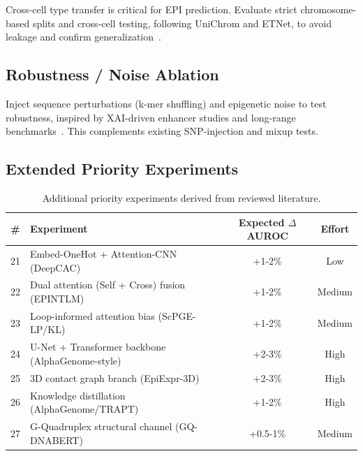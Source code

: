 \documentclass[11pt,a4paper]{article}
\begin{document}
Cross-cell type transfer is critical for EPI prediction. Evaluate strict chromosome-based splits and cross-cell testing, following UniChrom and ETNet, to avoid leakage and confirm generalization~\cite{unichrom,etnet}.

\subsection{Robustness / Noise Ablation}

Inject sequence perturbations (k-mer shuffling) and epigenetic noise to test robustness, inspired by XAI-driven enhancer studies and long-range benchmarks~\cite{sequence_free_enhancer,dnalongbench}. This complements existing SNP-injection and mixup tests.

\subsection{Extended Priority Experiments}

\begin{table}[H]
\centering
\begin{tabular}{clcc}
\toprule
\textbf{\#} & \textbf{Experiment} & \textbf{Expected $\Delta$AUROC} & \textbf{Effort} \\
\midrule
21 & Embed-OneHot + Attention-CNN (DeepCAC) & +1-2\% & Low \\
22 & Dual attention (Self + Cross) fusion (EPINTLM) & +1-2\% & Medium \\
23 & Loop-informed attention bias (ScPGE-LP/KL) & +1-2\% & Medium \\
24 & U-Net + Transformer backbone (AlphaGenome-style) & +2-3\% & High \\
25 & 3D contact graph branch (EpiExpr-3D) & +2-3\% & High \\
26 & Knowledge distillation (AlphaGenome/TRAPT) & +1-2\% & High \\
27 & G-Quadruplex structural channel (GQ-DNABERT) & +0.5-1\% & Medium \\
\bottomrule
\end{tabular}
\caption{Additional priority experiments derived from reviewed literature.}
\end{table}
\end{document}
